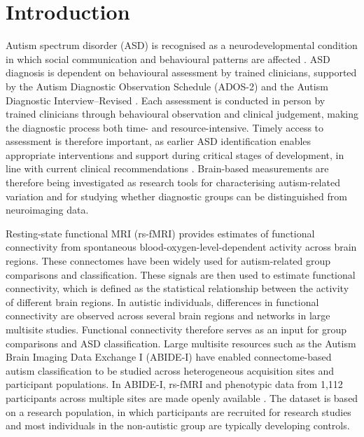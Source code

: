 \section{Introduction}
\label{sec:introduction}

Autism spectrum disorder (ASD) is recognised as a neurodevelopmental condition in which social communication and behavioural patterns are affected \citep{Maenneretal2023}. ASD diagnosis is dependent on behavioural
assessment by trained clinicians, supported by the Autism Diagnostic Observation Schedule (ADOS-2)
\citep{CHOP_ADOS2} and the Autism Diagnostic Interview--Revised \citep{Lordetal1994}.
Each assessment is conducted in person by trained clinicians through behavioural observation and clinical judgement, making the diagnostic process both time- and resource-intensive. Timely access to assessment is therefore important, as earlier ASD identification enables appropriate interventions and support during critical stages of development, in line with current clinical recommendations \citep{Zwaigenbaumetal2015}. Brain-based measurements are therefore being investigated as research tools for characterising autism-related variation and for studying whether diagnostic groups can be distinguished from neuroimaging data.


Resting-state functional MRI (rs-fMRI) provides estimates of functional connectivity from spontaneous blood-oxygen-level-dependent activity across brain regions. These connectomes have been widely used for autism-related group comparisons and classification. These signals are then used to estimate functional connectivity, which is defined as the statistical relationship between the activity of different brain regions. In autistic individuals, differences in functional connectivity are observed across several brain regions and networks in large multisite studies. Functional connectivity therefore serves as an input for group comparisons and ASD classification. Large multisite resources such as the Autism Brain Imaging Data Exchange I (ABIDE-I) have enabled connectome-based autism classification to be studied across heterogeneous acquisition sites and participant populations. In ABIDE-I, rs-fMRI and phenotypic data from 1,112 participants across multiple sites are made openly available \citep{DiMartinoetal2014}. The dataset is based on a research population, in which participants are recruited for research studies and most individuals in the non-autistic group are typically developing controls.


